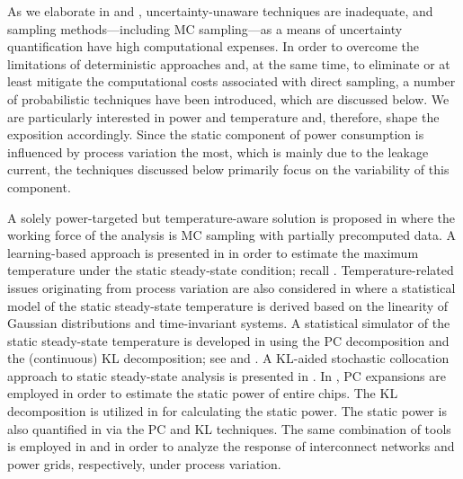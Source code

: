As we elaborate in  and , uncertainty-unaware
techniques are inadequate, and sampling methods---including \ac{MC}
sampling---as a means of uncertainty quantification have high computational
expenses. In order to overcome the limitations of deterministic approaches and,
at the same time, to eliminate or at least mitigate the computational costs
associated with direct sampling, a number of probabilistic techniques have been
introduced, which are discussed below. We are particularly interested in power
and temperature and, therefore, shape the exposition accordingly. Since the
static component of power consumption is influenced by process variation the
most, which is mainly due to the leakage current, the techniques discussed below
primarily focus on the variability of this component.

A solely power-targeted but temperature-aware solution is proposed in
\cite{chandra2010} where the working force of the analysis is \ac{MC} sampling
with partially precomputed data. A learning-based approach is presented in
\cite{juan2011} in order to estimate the maximum temperature under the static
steady-state condition; recall .
Temperature-related issues originating from process variation are also
considered in \cite{juan2012} where a statistical model of the static
steady-state temperature is derived based on the linearity of Gaussian
distributions and time-invariant systems. A statistical simulator of the static
steady-state temperature is developed in \cite{huang2009a} using the \ac{PC}
decomposition and the (continuous) \ac{KL} decomposition; see
 and . A \ac{KL}-aided
stochastic collocation \cite{maitre2010, xiu2010} approach to static
steady-state analysis is presented in \cite{lee2013}. In \cite{shen2009},
\ac{PC} expansions are employed in order to estimate the static power of entire
chips. The \ac{KL} decomposition is utilized in \cite{bhardwaj2006} for
calculating the static power. The static power is also quantified in
\cite{bhardwaj2008} via the \ac{PC} and \ac{KL} techniques. The same combination
of tools is employed in \cite{vrudhula2006} and \cite{ghanta2006} in order to
analyze the response of interconnect networks and power grids, respectively,
under process variation.

